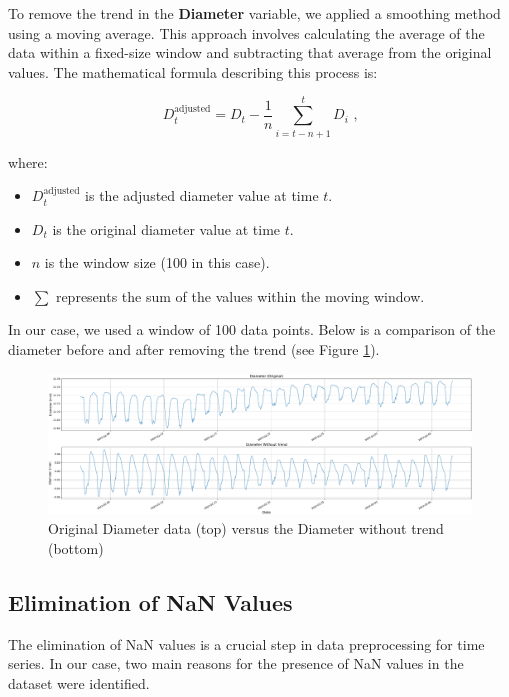 To remove the trend in the \textbf{Diameter} variable, we applied a smoothing method using a moving average. This approach involves calculating the average of the data within a fixed-size window and subtracting that average from the original values. The mathematical formula describing this process is:

\begin{equation}
D_t^{\text{adjusted}} = D_t - \frac{1}{n} \sum_{i=t-n+1}^{t} D_i \text{ ,}
\end{equation}

where:
\begin{itemize}
    \item $D_t^{\text{adjusted}}$ is the adjusted diameter value at time $t$.
    \item $D_t$ is the original diameter value at time $t$.
    \item $n$ is the window size (100 in this case).
    \item $\sum$ represents the sum of the values within the moving window.
\end{itemize}

In our case, we used a window of 100 data points. Below is a comparison of the diameter before and after removing the trend (see Figure \ref{WithoutTrend_Diameter}).

\begin{figure}[htbp]
    \centering
    \includegraphics[width=15 cm]{5_ChapterDesign/figuras/3_Trend/WithoutTrend_Diameter}
    \caption{Original Diameter data (top) versus the Diameter without trend (bottom)}
    \label{WithoutTrend_Diameter}
\end{figure}


\subsection{Elimination of NaN Values}

The elimination of NaN values is a crucial step in data preprocessing for time series. In our case, two main reasons for the presence of NaN values in the dataset were identified.

